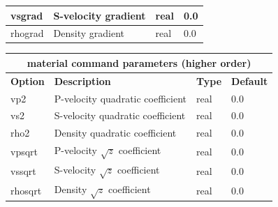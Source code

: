 \documentclass[11pt]{report}
\begin{document}
{\begin{center}
\begin{tabular}{|l|p{8cm}|l|l|}
		vsgrad      & S-velocity gradient & real      & 0.0               \\ \hline
		rhograd     & Density gradient    & real      & 0.0               \\ \hline
	\end{tabular}
\end{center}
\begin{center}
	\begin{tabular}{|l|p{8cm}|l|l|} \hline
		\multicolumn{4}{|c|}{\bf material command parameters (higher order)}       \\ \hline
		\bf{Option} & \bf{Description}                  & \bf{Type} & \bf{Default} \\ \hline \hline
		vp2         & P-velocity quadratic coefficient  & real      & 0.0          \\ \hline
		vs2         & S-velocity quadratic coefficient  & real      & 0.0          \\ \hline
		rho2        & Density quadratic coefficient     & real      & 0.0          \\ \hline
		vpsqrt      & P-velocity $\sqrt{z}$ coefficient & real      & 0.0          \\ \hline
		vssqrt      & S-velocity $\sqrt{z}$ coefficient & real      & 0.0          \\ \hline
		rhosqrt     & Density $\sqrt{z}$ coefficient    & real      & 0.0          \\ \hline
	\end{tabular}
\end{center}

}
\end{document}
